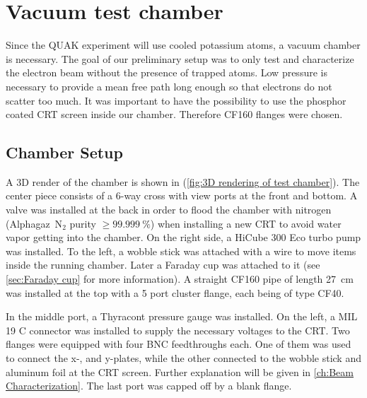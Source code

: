 
\chapter{Vacuum test chamber}
\label{ch:Vacuum chamber}

Since the QUAK experiment will use cooled potassium atoms, a vacuum chamber is necessary. The goal of our preliminary setup was to only test and characterize the electron beam without the presence of trapped atoms. Low pressure is necessary to provide a mean free path long enough so that electrons do not scatter too much. It was important to have the possibility to use the phosphor coated CRT screen inside our chamber. Therefore CF160 flanges were chosen. 


\section{Chamber Setup}
\label{sec:Chamber Setup}

A 3D render of the chamber is shown in (\cref{fig:3D rendering of test chamber}). The center piece consists of a 6-way cross with view ports at the front and bottom. A valve was installed at the back in order to flood the chamber with nitrogen (Alphagaz\texttrademark~N$_2$ purity $\ge\SI{99.999}{\percent}$) when installing a new CRT to avoid water vapor getting into the chamber. On the right side, a HiCube 300 Eco turbo pump was installed. To the left, a wobble stick was attached with a wire to move items inside the running chamber. Later a Faraday cup was attached to it (see \cref{sec:Faraday cup} for more information). A straight CF160 pipe of length \SI{27}{\centi\meter} was installed at the top with a 5 port cluster flange, each being of type CF40.
 
In the middle port, a Thyracont  pressure gauge was installed. On the left, a MIL 19 C connector was installed to supply the necessary voltages to the CRT. Two flanges were equipped with four BNC feedthroughs each. One of them was used to connect the x-, and y-plates, while the other connected to the wobble stick and aluminum foil at the CRT screen. Further explanation will be given in \cref{ch:Beam Characterization}. The last port was capped off by a blank flange.
 
